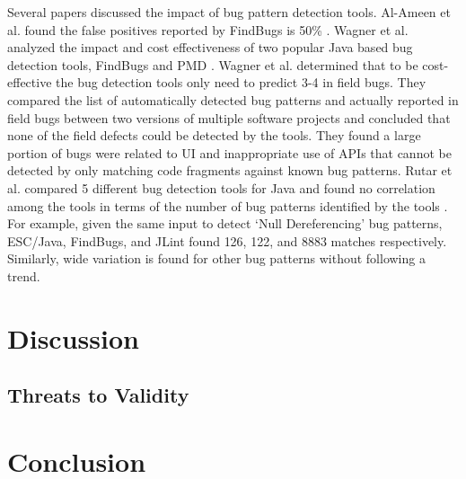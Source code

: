 \documentclass[conference]{IEEEtran}
\begin{document}
Several papers discussed the impact of bug pattern detection tools. Al-Ameen et al. found the false positives reported by FindBugs is 50\% \cite{making_al_ameen}. Wagner et al. analyzed the impact and cost effectiveness of two popular Java based bug detection tools, FindBugs and PMD \cite{Evaluation_Wagner}. Wagner et al. determined that to be cost-effective the bug detection tools only need to predict 3-4 in field bugs. They compared the list of automatically detected bug patterns and actually reported in field bugs between two versions of multiple software projects and concluded that none of the field defects could be detected by the tools. They found a large portion of bugs were related to UI and inappropriate use of APIs that cannot be detected by only matching code fragments against known bug patterns. Rutar et al. compared 5 different bug detection tools for Java and found no correlation among the tools in terms of the number of bug patterns identified by the tools \cite{comparison_Rutar}. For example, given the same input to detect `Null Dereferencing' bug patterns, ESC/Java, FindBugs, and JLint found 126, 122, and 8883 matches respectively. Similarly, wide variation is found for other bug patterns without following a trend.


\section{Discussion}
\subsection{Threats to Validity}
\section{Conclusion}




%
%
\end{document}
